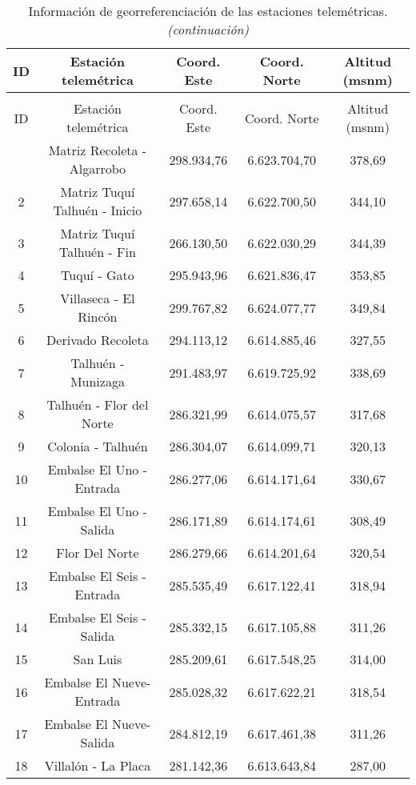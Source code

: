 \documentclass[]{article}
\begin{document}
\begin{longtable}[t]{ccccc}
\caption{\label{tab:unnamed-chunk-2}Información de georreferenciación de las estaciones telemétrica.}\\
\toprule
\textbf{ID} & \textbf{Estación telemétrica} & \textbf{Coord. Este} & \textbf{Coord. Norte} & \textbf{Altitud (msnm)}\\
\midrule
\endfirsthead
\caption[]{Información de georreferenciación de las estaciones telemétricas. \emph{(continuación)}}\\
\toprule
ID & Estación telemétrica & Coord. Este & Coord. Norte & Altitud (msnm)\\
\midrule
\endhead
\
\endfoot
\bottomrule
\endlastfoot
1 & Matriz Recoleta - Algarrobo & 298.934,76 & 6.623.704,70 & 378,69\\
2 & Matriz Tuquí Talhuén - Inicio & 297.658,14 & 6.622.700,50 & 344,10\\
3 & Matriz Tuquí Talhuén - Fin & 266.130,50 & 6.622.030,29 & 344,39\\
4 & Tuquí - Gato & 295.943,96 & 6.621.836,47 & 353,85\\
5 & Villaseca - El Rincón & 299.767,82 & 6.624.077,77 & 349,84\\
6 & Derivado Recoleta & 294.113,12 & 6.614.885,46 & 327,55\\
7 & Talhuén - Munizaga & 291.483,97 & 6.619.725,92 & 338,69\\
8 & Talhuén - Flor del Norte & 286.321,99 & 6.614.075,57 & 317,68\\
9 & Colonia - Talhuén & 286.304,07 & 6.614.099,71 & 320,13\\
10 & Embalse El Uno - Entrada & 286.277,06 & 6.614.171,64 & 330,67\\
11 & Embalse El Uno - Salida & 286.171,89 & 6.614.174,61 & 308,49\\
12 & Flor Del Norte & 286.279,66 & 6.614.201,64 & 320,54\\
13 & Embalse El Seis - Entrada & 285.535,49 & 6.617.122,41 & 318,94\\
14 & Embalse El Seis - Salida & 285.332,15 & 6.617.105,88 & 311,26\\
15 & San Luis & 285.209,61 & 6.617.548,25 & 314,00\\
16 & Embalse El Nueve-Entrada & 285.028,32 & 6.617.622,21 & 318,54\\
17 & Embalse El Nueve-Salida & 284.812,19 & 6.617.461,38 & 311,26\\
18 & Villalón - La Placa & 281.142,36 & 6.613.643,84 & 287,00\\

\end{longtable}
\end{document}
